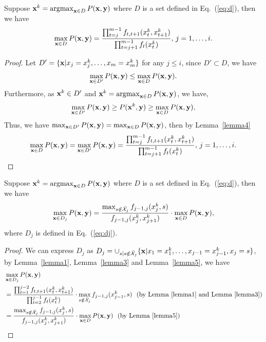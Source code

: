 \begin{lemma}
\label{lemma6}
Suppose $\mathbf{x}^k = \operatorname*{argmax}_{\mathbf{x} \in D} P(\mathbf{x},\mathbf{y})$ where $D$ is a set defined in Eq.~(\ref{eq:d}),
then we have
\begin{equation*}
\max_{\mathbf{x} \in D} P(\mathbf{x},\mathbf{y}) = \frac{\prod_{t=j}^{m-1} f_{t,t+1}(x_t^k, x_{t+1}^k)} {\prod_{t=j+1}^{m-1} f_t(x_t^k)},
\, j = 1, \dots, i.
\end{equation*}
\end{lemma}

\begin{proof}
Let $D' = \{\mathbf{x} |x_j = x_j^k, \dots, x_m = x_m^k \}$ for any $j \le i$,
since $D' \subset D$, we have
\begin{equation*}
\max_{\mathbf{x} \in D'} P(\mathbf{x},\mathbf{y}) \le \max_{\mathbf{x} \in D} P(\mathbf{x},\mathbf{y}).
\end{equation*}
Furthermore, as $\mathbf{x}^k \in D'$ and $\mathbf{x}^k = \operatorname*{argmax}_{\mathbf{x} \in D} P(\mathbf{x},\mathbf{y})$,
we have,
\begin{equation*}
\max_{\mathbf{x} \in D'} P(\mathbf{x},\mathbf{y}) \ge P(\mathbf{x}^k,\mathbf{y}) \ge \max_{\mathbf{x} \in D} P(\mathbf{x},\mathbf{y}),
\end{equation*}
Thus, we have $\max_{\mathbf{x} \in D'} P(\mathbf{x},\mathbf{y}) = \max_{\mathbf{x} \in D} P(\mathbf{x},\mathbf{y})$,
then by Lemma~\ref{lemma4}
\begin{equation*}
\max_{\mathbf{x} \in D} P(\mathbf{x},\mathbf{y}) = \max_{\mathbf{x} \in D'} P(\mathbf{x},\mathbf{y}) 
= \frac{\prod_{t=j}^{m-1} f_{t,t+1}(x_t^k, x_{t+1}^k)} {\prod_{t=j+1}^{m-1} f_t(x_t^k)},
\, j = 1, \dots, i.
\end{equation*}
\end{proof}

\begin{theorem}
\label{theorem3}
Suppose $\mathbf{x}^k = \operatorname*{argmax}_{\mathbf{x} \in D} P(\mathbf{x},\mathbf{y})$ where $D$ is a set defined in Eq.~(\ref{eq:d}),
then we have
\begin{equation*}
\max_{\mathbf{x} \in D_j} P(\mathbf{x},\mathbf{y}) 
= \frac{\max_{s \notin \bar{\mathcal{X}}_j} f_{j-1,j}(x_j^k,s)} {f_{j-1,j}(x_j^k,x_{j+1}^k)}
  \cdot \max_{\mathbf{x} \in D} P(\mathbf{x},\mathbf{y}),
\end{equation*}
where $D_j$ is defined in Eq.~(\ref{eq:dj}). 
\end{theorem}

\begin{proof}
We can express $D_j$ as 
$D_j = \cup_{s |s \notin \bar{\mathcal{X}}_j} \{\mathbf{x} |x_1 = x_1^k, \dots, x_{j-1} = x_{j-1}^k, x_j = s\}$,
by Lemma~\ref{lemma1}, Lemma~\ref{lemma3} and Lemma~\ref{lemma5}, we have
\begin{align*}
&\max_{\mathbf{x} \in D_j} P(\mathbf{x},\mathbf{y}) \\
&= \frac{\prod_{t=1}^{j-2} f_{t,t+1}(x_t^k,x_{t+1}^k)} {\prod_{t=2}^{j-1} f_t(x_t^k)}
   \cdot \max_{s \notin \bar{\mathcal{X}}_j} f_{j-1,j}(x_{j-1}^k, s)
~~\text{(by Lemma~\ref{lemma1} and Lemma~\ref{lemma3})} \\
&= \frac{\max_{s \notin \bar{\mathcal{X}}_j} f_{j-1,j}(x_j^k,s)} {f_{j-1,j}(x_j^k,x_{j+1}^k)}
   \cdot \max_{\mathbf{x} \in D} P(\mathbf{x},\mathbf{y})
~~\text{(by Lemma~\ref{lemma5})}
\end{align*}
\end{proof}

